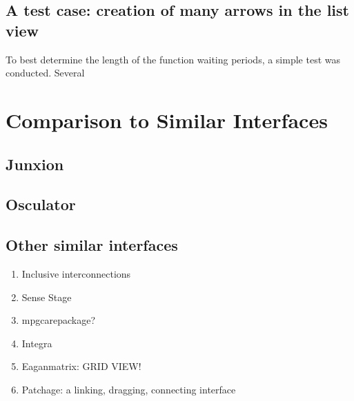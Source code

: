 
	\subsection{A test case: creation of many arrows in the list view} %
	\label{sub:test_case}

To best determine the length of the function waiting periods, a simple test was conducted. Several



\section{Comparison to Similar Interfaces} %
\label{sec:comparison_to_similar_interfaces}

	\subsection{Junxion} %
	\label{sub:junxion}
		\cite{junxion}

	\subsection{Osculator} %
	\label{sub:osculator}
		\cite{osculator}

	\subsection{Other similar interfaces} %
	\label{sub:other_similar_interfaces}
	
	\begin{enumerate}
		\item Inclusive interconnections 
		\item Sense Stage 
		\item mpgcarepackage?
		\item Integra 
		\item Eaganmatrix: GRID VIEW! 
		\item Patchage: a linking, dragging, connecting interface 
	\end{enumerate}


